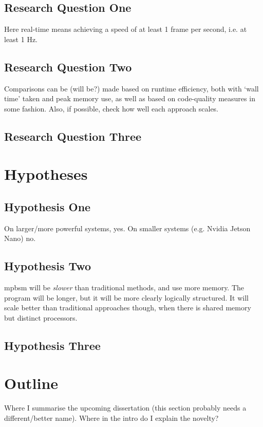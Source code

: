 \subsection{Research Question One}
Here real-time means achieving a speed of at least 1 frame per second, i.e. at least 1 Hz.

\subsection{Research Question Two}
Comparisons can be (will be?) made based on runtime efficiency, both with `wall time' taken and peak memory use, as well as based on code-quality measures in some fashion.  Also, if possible, check how well each approach scales.

\subsection{Research Question Three}

\section{Hypotheses}

\subsection{Hypothesis One}
On larger/more powerful systems, yes.  On smaller systems (e.g. Nvidia Jetson Nano) no.

\subsection{Hypothesis Two}
\gls{mpbsm} will be \emph{slower} than traditional methods, and use more memory.  The program will be longer, but it will be more clearly logically structured.  It will scale better than traditional approaches though, when there is shared memory but distinct processors.

\subsection{Hypothesis Three}

\section{Outline}
Where I summarise the upcoming dissertation (this section probably needs a different/better name).  Where in the intro do I explain the novelty?